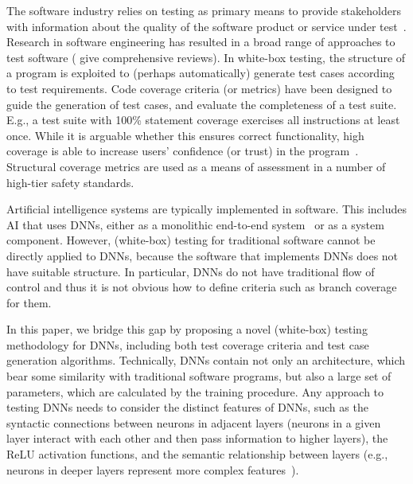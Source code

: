 \documentclass[runningheads,a4paper]{llncs}
\begin{document}
The software industry relies on testing as primary means to provide
stakeholders with information about the quality of the software product or
service under test~\cite{kaner2006}.
Research in software engineering has resulted in a broad range of approaches
to test software (\cite{ZHM1997,JH2011,SWMPHS2017} give comprehensive
reviews).  In white-box testing, the structure of a program is exploited to
(perhaps automatically) generate test cases according to test requirements. 
Code coverage criteria (or metrics) have been designed to guide the
generation of test cases, and evaluate the completeness of a test suite. 
E.g., a test suite with 100\% statement coverage exercises all instructions
at least once.  While it is arguable whether this ensures correct
functionality, high coverage is able to increase users' confidence (or
trust) in the program~\cite{ZHM1997}. Structural coverage metrics are used
as a means of assessment in a number of high-tier safety standards.

Artificial intelligence systems are typically implemented in software.  This
includes AI that uses DNNs, either as a monolithic end-to-end
system~\cite{NVIDIA} or as a system component.  However, (white-box) testing
for traditional software cannot be directly applied to DNNs, because the
software that implements DNNs does not have suitable structure.  In
particular, DNNs do not have traditional flow of control and thus it is not
obvious how to define criteria such as branch coverage for them.

In this paper, we bridge this gap by proposing a novel (white-box) testing
methodology for DNNs, including both test coverage criteria and test case
generation algorithms.  Technically, DNNs contain not only an architecture,
which bear some similarity with traditional software programs, but also a
large set of parameters, which are calculated by the training procedure. 
Any approach to testing DNNs needs to consider the distinct features of
DNNs, such as the syntactic connections between neurons in adjacent layers
(neurons in a given layer interact with each other and then pass information
to higher layers), the ReLU activation functions, and the semantic
relationship between layers (e.g., neurons in deeper layers represent more
complex features~\cite{YCNFL2015,olah2018the}).
\end{document}

